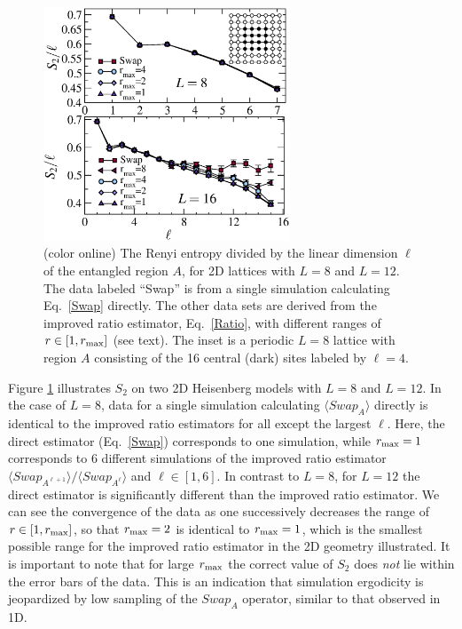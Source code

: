 \documentclass[prl,aps,twocolumn,floatfix,amsmath,amssymb,superscriptaddress,tightenlines]{revtex4}
\begin{document}
\begin{figure} {
\includegraphics[width=2.9in]{L8n16_ratio.eps} \caption{(color online) 
\label{L16fig}
The Renyi entropy divided by the linear dimension $\ell$ of the entangled region $A$, for 2D lattices with $L=8$ and $L=12$.  The data labeled ``Swap'' is from a single simulation calculating Eq.~\eqref{Swap} directly.  The other
data sets are derived from the improved ratio estimator, Eq.~\eqref{Ratio}, with different ranges of $r \in [1,r_{\rm max}]$ (see text).  The inset 
is a periodic $L=8$ lattice with region $A$ consisting of the 16 central (dark) sites labeled by $\ell = 4$.
}
} \end{figure}

Figure \ref{L16fig} illustrates $S_2$ on two 2D Heisenberg models with  $L=8$ and  $L=12$.  In the case of $L=8$, data for a single 
simulation calculating $\langle Swap_A \rangle$ directly is identical to the improved ratio estimators for all except the largest $\ell$.  
Here, the direct estimator (Eq.~\eqref{Swap}) corresponds to one simulation, while $r_{\rm max}=1$ corresponds to 6 different simulations of the improved ratio estimator ${\langle Swap_{A^{\ell+1}}\rangle}/{\langle Swap_{A^{\ell}}\rangle}$ and $\ell \in [1,6]$.
In contrast to $L=8$, for $L=12$ the direct estimator is significantly different than 
the improved ratio estimator.  We can see the convergence of the data as one successively decreases the range of $r \in [1,r_{\rm max}]$, 
so that $r_{\rm max}=2$ is identical to $r_{\rm max}=1$, which is the smallest possible range for the improved ratio estimator in the 2D geometry illustrated.  It is important to note that for large $r_{\rm max}$ the correct value of $S_2$ does {\it not} lie within the error bars of the data.  
This is an indication that simulation ergodicity is jeopardized by low sampling of the $Swap_A$ operator, similar to that observed in 1D.
\end{document}
